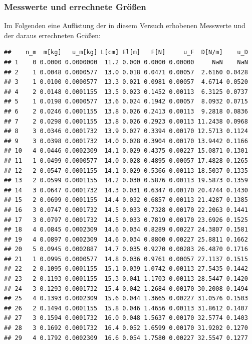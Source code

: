 \documentclass[
]{article}
\begin{document}
\hypertarget{messwerte-und-errechnete-gruxf6uxdfen}{%
\subsubsection{Messwerte und errechnete
Größen}\label{messwerte-und-errechnete-gruxf6uxdfen}}

Im Folgenden eine Auflistung der in diesem Versuch erhobenen Messwerte
und der daraus errechneten Größen:

\begin{verbatim}
##    n_m  m[kg]   u_m[kg] L[cm] El[m]   F[N]     u_F  D[N/m]    u_D
## 1    0 0.0000 0.0000000  11.2 0.000 0.0000 0.00000     NaN    NaN
## 2    1 0.0048 0.0000577  13.0 0.018 0.0471 0.00057  2.6160 0.0428
## 3    1 0.0100 0.0000577  13.3 0.021 0.0981 0.00057  4.6714 0.0520
## 4    2 0.0148 0.0001155  13.5 0.023 0.1452 0.00113  6.3125 0.0737
## 5    1 0.0198 0.0000577  13.6 0.024 0.1942 0.00057  8.0932 0.0715
## 6    2 0.0246 0.0001155  13.8 0.026 0.2413 0.00113  9.2818 0.0836
## 7    2 0.0298 0.0001155  13.8 0.026 0.2923 0.00113 11.2438 0.0968
## 8    3 0.0346 0.0001732  13.9 0.027 0.3394 0.00170 12.5713 0.1124
## 9    3 0.0398 0.0001732  14.0 0.028 0.3904 0.00170 13.9442 0.1166
## 10   4 0.0446 0.0002309  14.1 0.029 0.4375 0.00227 15.0871 0.1301
## 11   1 0.0499 0.0000577  14.0 0.028 0.4895 0.00057 17.4828 0.1265
## 12   2 0.0547 0.0001155  14.1 0.029 0.5366 0.00113 18.5037 0.1335
## 13   2 0.0599 0.0001155  14.2 0.030 0.5876 0.00113 19.5873 0.1359
## 14   3 0.0647 0.0001732  14.3 0.031 0.6347 0.00170 20.4744 0.1430
## 15   2 0.0699 0.0001155  14.4 0.032 0.6857 0.00113 21.4287 0.1385
## 16   3 0.0747 0.0001732  14.5 0.033 0.7328 0.00170 22.2063 0.1441
## 17   3 0.0797 0.0001732  14.5 0.033 0.7819 0.00170 23.6926 0.1525
## 18   4 0.0845 0.0002309  14.6 0.034 0.8289 0.00227 24.3807 0.1581
## 19   4 0.0897 0.0002309  14.6 0.034 0.8800 0.00227 25.8811 0.1662
## 20   5 0.0945 0.0002887  14.7 0.035 0.9270 0.00283 26.4870 0.1716
## 21   1 0.0995 0.0000577  14.8 0.036 0.9761 0.00057 27.1137 0.1515
## 22   2 0.1095 0.0001155  15.1 0.039 1.0742 0.00113 27.5435 0.1442
## 23   2 0.1193 0.0001155  15.3 0.041 1.1703 0.00113 28.5447 0.1420
## 24   3 0.1293 0.0001732  15.4 0.042 1.2684 0.00170 30.2008 0.1494
## 25   4 0.1393 0.0002309  15.6 0.044 1.3665 0.00227 31.0576 0.1503
## 26   2 0.1494 0.0001155  15.8 0.046 1.4656 0.00113 31.8612 0.1407
## 27   3 0.1594 0.0001732  16.0 0.048 1.5637 0.00170 32.5774 0.1403
## 28   3 0.1692 0.0001732  16.4 0.052 1.6599 0.00170 31.9202 0.1270
## 29   4 0.1792 0.0002309  16.6 0.054 1.7580 0.00227 32.5547 0.1277

\end{verbatim}
\end{document}
